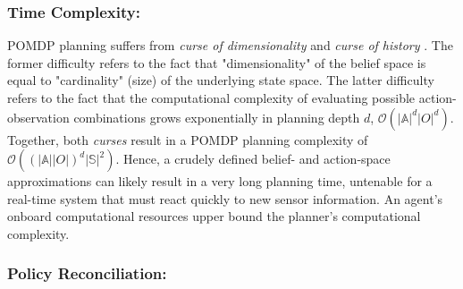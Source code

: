 \documentclass[letterpaper]{article} %
\begin{document}
\subsubsection{Time Complexity:} \hfill
\vspace{-0.25pt}

\noindent
POMDP planning suffers from \textit{curse of dimensionality} \cite{KLC98} and \textit{curse of history} \cite{Pineau03}. The former difficulty refers to the fact that "dimensionality" of the belief space is equal to "cardinality" (size) of the underlying state space. %
The latter difficulty refers to the fact that the computational complexity of evaluating possible action-observation combinations grows exponentially in planning depth $d$, $\mathcal{O}(|\mathbb{A}|^d|O|^d)$. Together, both \textit{curses} result in a POMDP planning complexity of $\mathcal{O}((|\mathbb{A}||O|)^d|\mathbb{S}|^2)$. Hence, a crudely defined belief- and action-space approximations can likely result in a very long planning time, untenable for a real-time system that must react quickly to new sensor information. An agent's onboard computational resources upper bound the planner's computational complexity.

\subsubsection{Policy Reconciliation:} \hfill
\vspace{-0.25pt}
\end{document}
